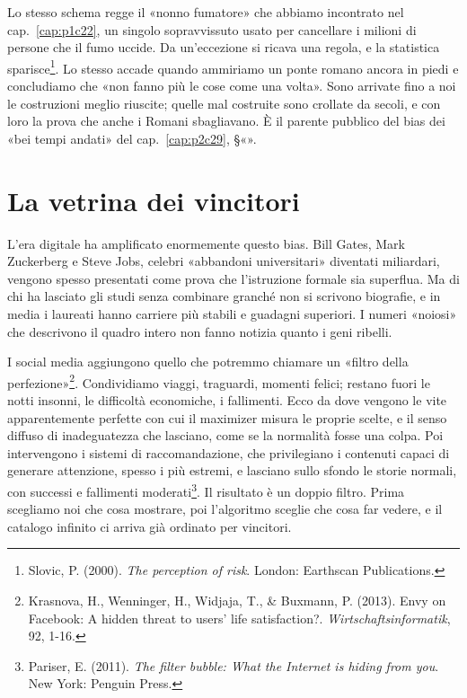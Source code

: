 Lo stesso schema regge il «nonno fumatore» che abbiamo incontrato nel cap.~\ref{cap:p1c22}, un singolo sopravvissuto usato per cancellare i milioni di persone che il fumo uccide. Da un'eccezione si ricava una regola, e la statistica sparisce\footnote{Slovic, P. (2000). \textit{The perception of risk}. London: Earthscan Publications.}. Lo stesso accade quando ammiriamo un ponte romano ancora in piedi e concludiamo che «non fanno più le cose come una volta». Sono arrivate fino a noi le costruzioni meglio riuscite; quelle mal costruite sono crollate da secoli, e con loro la prova che anche i Romani sbagliavano. È il parente pubblico del bias dei «bei tempi andati» del cap.~\ref{cap:p2c29}, §«».

\section{La vetrina dei vincitori}
\label{sec:p2c30-la-vetrina-dei}

L'era digitale ha amplificato enormemente questo bias. Bill Gates, Mark Zuckerberg e Steve Jobs, celebri «abbandoni universitari» diventati miliardari, vengono spesso presentati come prova che l'istruzione formale sia superflua. Ma di chi ha lasciato gli studi senza combinare granché non si scrivono biografie, e in media i laureati hanno carriere più stabili e guadagni superiori. I numeri «noiosi» che descrivono il quadro intero non fanno notizia quanto i geni ribelli.

I social media aggiungono quello che potremmo chiamare un «filtro della perfezione»\footnote{Krasnova, H., Wenninger, H., Widjaja, T., \& Buxmann, P. (2013). Envy on Facebook: A hidden threat to users' life satisfaction?. \textit{Wirtschaftsinformatik}, 92, 1-16.}. Condividiamo viaggi, traguardi, momenti felici; restano fuori le notti insonni, le difficoltà economiche, i fallimenti. Ecco da dove vengono le vite apparentemente perfette con cui il maximizer misura le proprie scelte, e il senso diffuso di inadeguatezza che lasciano, come se la normalità fosse una colpa. Poi intervengono i sistemi di raccomandazione, che privilegiano i contenuti capaci di generare attenzione, spesso i più estremi, e lasciano sullo sfondo le storie normali, con successi e fallimenti moderati\footnote{Pariser, E. (2011). \textit{The filter bubble: What the Internet is hiding from you}. New York: Penguin Press.}. Il risultato è un doppio filtro. Prima scegliamo noi che cosa mostrare, poi l'algoritmo sceglie che cosa far vedere, e il catalogo infinito ci arriva già ordinato per vincitori.

